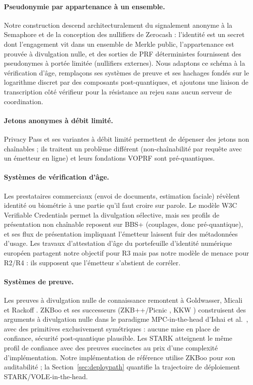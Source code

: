 \documentclass[11pt]{article}
\theoremstyle{definition}
\begin{document}
\paragraph{Pseudonymie par appartenance à un ensemble.} Notre construction descend
architecturalement du signalement anonyme à la Semaphore \cite{semaphore} et de la
conception des nullifiers de Zerocash \cite{zerocash} : l'identité est un secret dont
l'engagement vit dans un ensemble de Merkle public, l'appartenance est prouvée à
divulgation nulle, et des sorties de PRF déterministes fournissent des pseudonymes à
portée limitée (nullifiers externes). Nous adaptons ce schéma à la vérification d'âge,
remplaçons ses systèmes de preuve et ses hachages fondés sur le logarithme discret par des
composants post-quantiques, et ajoutons une liaison de transcription côté vérifieur pour
la résistance au rejeu sans aucun serveur de coordination.

\paragraph{Jetons anonymes à débit limité.} Privacy Pass \cite{privacypass} et ses
variantes à débit limité permettent de dépenser des jetons non chaînables ; ils traitent
un problème différent (non-chaînabilité par requête avec un émetteur en ligne) et leurs
fondations VOPRF sont pré-quantiques.

\paragraph{Systèmes de vérification d'âge.} Les prestataires commerciaux (envoi de
documents, estimation faciale) révèlent identité ou biométrie à une partie qu'il faut
croire sur parole. Le modèle W3C Verifiable Credentials \cite{w3cvc} permet la divulgation
sélective, mais ses profils de présentation non chaînable reposent sur BBS+ (couplages,
donc pré-quantique), et ses flux de présentation impliquant l'émetteur laissent fuir des
métadonnées d'usage. Les travaux d'attestation d'âge du portefeuille d'identité numérique
européen partagent notre objectif pour R3 mais pas notre modèle de menace pour R2/R4 : ils
supposent que l'émetteur s'abstient de corréler.

\paragraph{Systèmes de preuve.} Les preuves à divulgation nulle de connaissance remontent
à Goldwasser, Micali et Rackoff \cite{gmr}. ZKBoo \cite{zkboo} et ses successeurs
(ZKB++/Picnic \cite{picnic}, KKW \cite{kkw}) construisent des arguments à divulgation
nulle dans le paradigme MPC-in-the-head d'Ishai et al.\ \cite{ikos}, avec des primitives
exclusivement symétriques : aucune mise en place de confiance, sécurité post-quantique
plausible. Les STARK \cite{stark} atteignent le même profil de confiance avec des preuves
succinctes au prix d'une complexité d'implémentation. Notre implémentation de référence
utilise ZKBoo pour son auditabilité ; la Section~\ref{sec:deploypath} quantifie la
trajectoire de déploiement STARK/VOLE-in-the-head.
\end{document}
